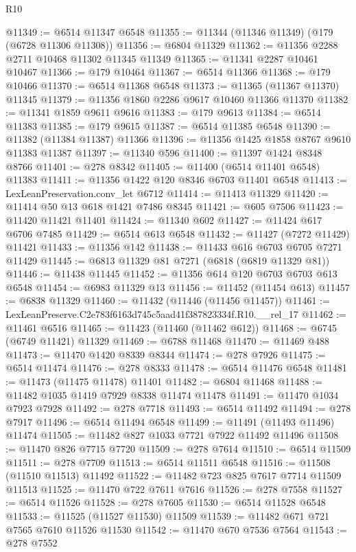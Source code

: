 \begin{lexlean}{R10}
\begin{coremodule}
@11349 := @6514 @11347 @6548
@11355 := @11344 (@11346 @11349) (@179 (@6728 @11306 @11308))
@11356 := @6804 @11329
@11362 := @11356 @2288 @2711 @10468 @11302 @11345 @11349
@11365 := @11341 @2287 @10461 @10467
@11366 := @179 @10464
@11367 := @6514 @11366
@11368 := @179 @10466
@11370 := @6514 @11368 @6548
@11373 := @11365 (@11367 @11370) @11345
@11379 := @11356 @1860 @2286 @9617 @10460 @11366 @11370
@11382 := @11341 @1859 @9611 @9616
@11383 := @179 @9613
@11384 := @6514 @11383
@11385 := @179 @9615
@11387 := @6514 @11385 @6548
@11390 := @11382 (@11384 @11387) @11366
@11396 := @11356 @1425 @1858 @8767 @9610 @11383 @11387
@11397 := @11340 @596
@11400 := @11397 @1424 @8348 @8766
@11401 := @278 @8342
@11405 := @11400 (@6514 @11401 @6548) @11383
@11411 := @11356 @1422 @120 @8346 @6703 @11401 @6548
@11413 := LexLeanPreservation.conv_let @6712
@11414 := @11413 @11329
@11420 := @11414 @50 @13 @618 @1421 @7486 @8345
@11421 := @605 @7506
@11423 := @11420 @11421 @11401
@11424 := @11340 @602
@11427 := @11424 @617 @6706 @7485
@11429 := @6514 @613 @6548
@11432 := @11427 (@7272 @11429) @11421
@11433 := @11356 @142
@11438 := @11433 @616 @6703 @6705 @7271 @11429
@11445 := @6813 @11329 @81 @7271 (@6818 (@6819 @11329 @81))
@11446 := @11438 @11445
@11452 := @11356 @614 @120 @6703 @6703 @613 @6548
@11454 := @6983 @11329 @13
@11456 := @11452 (@11454 @613)
@11457 := @6838 @11329
@11460 := @11432 (@11446 (@11456 @11457))
@11461 := LexLeanPreserve.C2e783f6163d745c5aad41f387823334f.R10.__rel_17
@11462 := @11461 @6516
@11465 := @11423 (@11460 (@11462 @612))
@11468 := @6745 (@6749 @11421) @11329
@11469 := @6788 @11468
@11470 := @11469 @488
@11473 := @11470 @1420 @8339 @8344
@11474 := @278 @7926
@11475 := @6514 @11474
@11476 := @278 @8333
@11478 := @6514 @11476 @6548
@11481 := @11473 (@11475 @11478) @11401
@11482 := @6804 @11468
@11488 := @11482 @1035 @1419 @7929 @8338 @11474 @11478
@11491 := @11470 @1034 @7923 @7928
@11492 := @278 @7718
@11493 := @6514 @11492
@11494 := @278 @7917
@11496 := @6514 @11494 @6548
@11499 := @11491 (@11493 @11496) @11474
@11505 := @11482 @827 @1033 @7721 @7922 @11492 @11496
@11508 := @11470 @826 @7715 @7720
@11509 := @278 @7614
@11510 := @6514 @11509
@11511 := @278 @7709
@11513 := @6514 @11511 @6548
@11516 := @11508 (@11510 @11513) @11492
@11522 := @11482 @723 @825 @7617 @7714 @11509 @11513
@11525 := @11470 @722 @7611 @7616
@11526 := @278 @7558
@11527 := @6514 @11526
@11528 := @278 @7605
@11530 := @6514 @11528 @6548
@11533 := @11525 (@11527 @11530) @11509
@11539 := @11482 @671 @721 @7565 @7610 @11526 @11530
@11542 := @11470 @670 @7536 @7564
@11543 := @278 @7552

\end{coremodule}
\end{lexlean}
